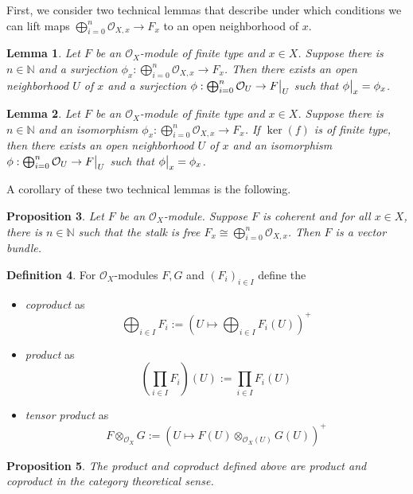 \documentclass{scrartcl}
\newcommand{\N}{\mathbb{N}}
\renewcommand{\O}{\mathcal{O}}
\newcommand\restr[2]{{
    \left.\kern-\nulldelimiterspace
    #1
    \vphantom{\big|}
    \right|_{#2}
}}
\newtheorem{prop}{Proposition}[section]
\newtheorem{lemma}[prop]{Lemma}
\theoremstyle{definition}
\newtheorem{definition}[prop]{Definition}
\begin{document}
First, we consider two technical lemmas that describe under which conditions we can lift maps $\bigoplus_{i = 0}^n \O_{X, x} \to F_x$ to an open neighborhood of $x$.
\begin{lemma}
    Let $F$ be an $\O_X$-module of finite type and $x \in X$.
    Suppose there is $n \in \N$ and a surjection $\phi_x: \bigoplus_{i = 0}^n \O_{X, x} \to F_x$.
    Then there exists an open neighborhood $U$ of $x$ and a surjection $\phi: \bigoplus_{i = 0}^n \O_U \to \restr{F}{U}$ such that $\restr{\phi}{x} = \phi_x$.
\end{lemma}
\begin{lemma}
    Let $F$ be an $\O_X$-module of finite type and $x \in X$.
    Suppose there is $n \in \N$ and an isomorphism $\phi_x: \bigoplus_{i = 0}^n \O_{X, x} \to F_x$.
    If $\ker(f)$ is of finite type, then there exists an open neighborhood $U$ of $x$ and an isomorphism $\phi: \bigoplus_{i = 0}^n \O_U \to \restr{F}{U}$ such that $\restr{\phi}{x} = \phi_x$.
\end{lemma}
A corollary of these two technical lemmas is the following.
\begin{prop}
    Let $F$ be an $\O_X$-module.
    Suppose $F$ is coherent and for all $x \in X$, there is $n \in \N$ such that the stalk is free $F_x \cong \bigoplus_{i = 0}^n \O_{X, x}$.
    Then $F$ is a vector bundle.
\end{prop}
\begin{definition}
    For $\O_X$-modules $F, G$ and $(F_i)_{i \in I}$ define the
    \begin{itemize}
        \item \emph{coproduct} as
        \begin{equation*}
            \bigoplus_{i \in I} F_i := \left( U \mapsto \bigoplus_{i \in I} F_i(U) \right)^+
        \end{equation*}
        \item \emph{product} as
        \begin{equation*}
            \left( \prod_{i \in I} F_i \right)(U) := \prod_{i \in I} F_i(U)
        \end{equation*}
        \item \emph{tensor product} as
        \begin{equation*}
            F \otimes_{\O_X} G := \left( U \mapsto F(U) \otimes_{\O_X(U)} G(U) \right)^+
        \end{equation*}
    \end{itemize}
\end{definition}
\begin{prop}
    The product and coproduct defined above are product and coproduct in the category theoretical sense.
\end{prop}
\end{document}

